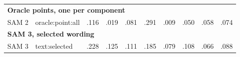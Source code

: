 \begin{landscape}
{\begin{longtable}{l l c c c c c c c c }
\multicolumn{10}{l}{\textbf{Oracle points, one per component}}\\
SAM 2 & oracle:point:all & .116 & .019 & .081 & .291 & .009 & .050 & .058 & .074 \\
\multicolumn{10}{l}{\textbf{SAM 3, selected wording}}\\
SAM 3 & text:selected & .228 & .125 & .111 & .185 & .079 & .108 & .066 & .088 \\
\end{longtable}
}
\vspace{-6pt}
\end{landscape}